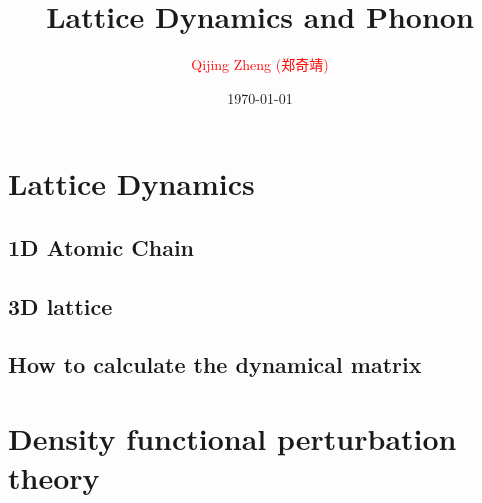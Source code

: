 \documentclass[8pt,dvipsnames]{beamer}
\title[]{
  Lattice Dynamics and Phonon
}
\author[Q.J. Zheng]{
  \textcolor{red}{Qijing Zheng (郑奇靖)} \\
}
\institute[D.P. USTC]{
  \texttt{zqj@ustc.edu.cn} \\
  \medskip
  Department of Physics \\
  \medskip
  University of Science \& Technology of China \\
  \smallskip
  \texttt{[image: logo.jpg]}
}
\date{\today}
\begin{document}

% 

\section{Lattice Dynamics}

\subsection{1D Atomic Chain}








\subsection{3D lattice}







\subsection{How to calculate the dynamical matrix}






\section{Density functional perturbation theory}







\end{document}
